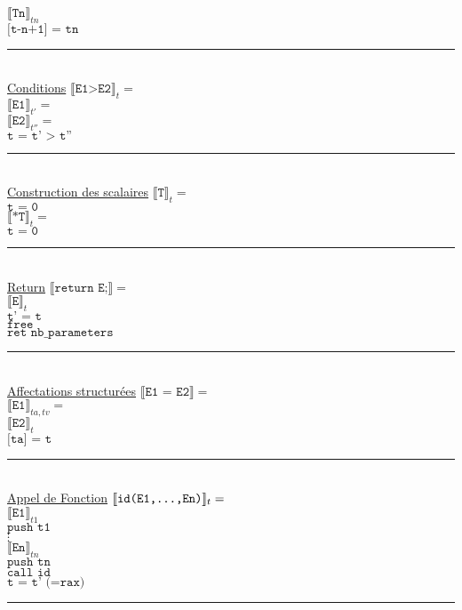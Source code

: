 \documentclass[12pt,twocolumn]{report}
\begin{document}
    $\llbracket \texttt{Tn} \rrbracket_{tn}$\\
    $\texttt{[t-n+1] = tn}$\\
\rule{9cm}{0.1pt}\\
    \underline{Conditions}
    $\llbracket \texttt{E1>E2} \rrbracket_t = $\\
    $\llbracket \texttt{E1} \rrbracket_{t'} = $\\
    $\llbracket \texttt{E2} \rrbracket_{t''} = $\\
    $\texttt{t = t' > t''}$\\
\rule{9cm}{0.1pt}\\
    \underline{Construction des scalaires}
    $\llbracket \texttt{T} \rrbracket_t= $\\
    $\texttt{t = 0} $\\
    $\llbracket \texttt{*T} \rrbracket_{t}= $\\
    $\texttt{t = 0}$ \\
\rule{9cm}{0.1pt}\\
    \underline{Return}
    $\llbracket \texttt{return E;} \rrbracket= $\\
    $\llbracket \texttt{E} \rrbracket_{t} $\\
    $\texttt{t' = t} $\\
    $\texttt{free}$\\
    $\texttt{ret nb\_parameters}$\\
\rule{9cm}{0.1pt}\\
    \underline{Affectations structurées}
    $\llbracket \texttt{E1 = E2} \rrbracket= $\\
    $\llbracket \texttt{E1} \rrbracket_{ta,tv}= $\\
    $\llbracket \texttt{E2} \rrbracket_{t}$\\
    $\texttt{[ta] = t}$\\    
\rule{9cm}{0.1pt}\\
    \underline{Appel de Fonction}
    $\llbracket \texttt{id(E1,\dots,En)} \rrbracket_t= $\\
    $\llbracket \texttt{E1} \rrbracket_{t1} $\\
    $\texttt{push t1} $\\
    $\vdots$\\
    $\llbracket \texttt{En} \rrbracket_{tn}$\\
    $\texttt{push tn} $\\
    $\texttt{call id}$\\
    $\texttt{t = t' (=rax)}$\\
\rule{9cm}{0.1pt}\\
\end{document}
